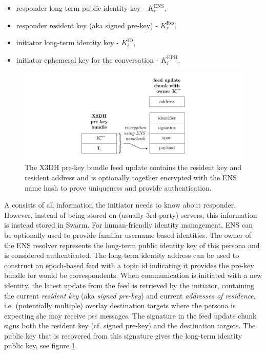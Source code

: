 \begin{itemize}
\item responder long-term public identity key - $K^{\mathrm{ENS}}_r$,
\item responder resident key (aka signed pre-key) - $K^{\mathrm{Res}}_r$,
\item initiator long-term identity key - $K^{\mathrm{ID}}_i$,
\item initiator ephemeral key for the conversation - $K^{\mathrm{EPH}}_i$.
\end{itemize}{}



\begin{figure}[htbp]
   \centering
   \includegraphics[width=\textwidth]{fig/prekey-bundle-feed-update.pdf}
   \caption[X3DH pre-key bundle feed update \statusgreen]{The X3DH pre-key bundle feed update contains the resident key and resident address and is optionally together encrypted with the ENS name hash to prove uniqueness and provide authentication.}
\label{fig:prekey-bundle-feed-update}
\end{figure}


A  consists of all information the initiator needs to know about responder. However, instead of being stored on (usually 3rd-party) servers, this information is instead stored in Swarm. For human-friendly identity management, ENS can be optionally used to provide familiar username based identities. The owner of the ENS resolver represents the long-term public identity key of this persona and is considered authenticated. The long-term identity address can be used to construct an epoch-based feed with a topic id indicating it provides the pre-key bundle for would be correspondents. When communication is initiated with a new identity, the latest update from the feed is retrieved by the initiator, containing the current \emph{resident key} (aka \emph{signed pre-key}) and current \emph{addresses of residence}, i.e. (potentially multiple) overlay destination targets where the persona is expecting she may receive pss messages. The signature in the feed update chunk signs both the resident key (cf. signed pre-key) and the destination targets. The public key that is recovered from this signature gives the long-term identity public key, see figure \ref{fig:prekey-bundle-feed-update}.


